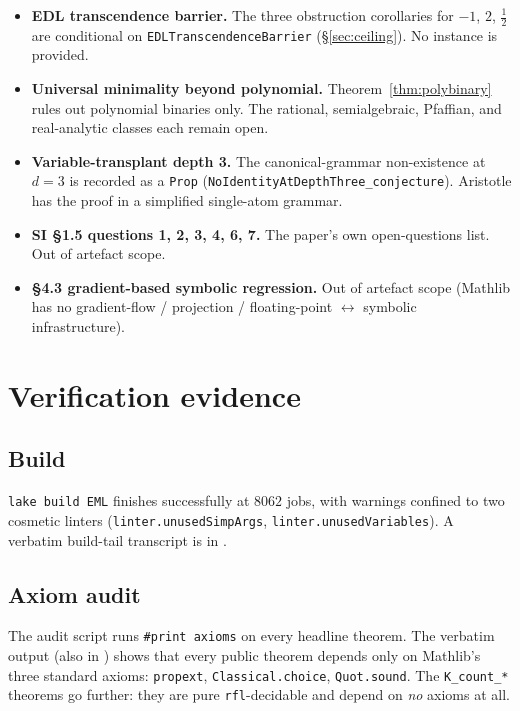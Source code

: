 \documentclass[11pt,a4paper]{article}
\theoremstyle{plain}
\theoremstyle{definition}
\begin{document}
\begin{itemize}[leftmargin=*, topsep=2pt, itemsep=2pt]
  \item \textbf{EDL transcendence barrier.} The three obstruction
    corollaries for $-1$, $2$, $\frac{1}{2}$ are conditional on
    \texttt{EDLTranscendenceBarrier} (\S\ref{sec:ceiling}). No
    instance is provided.
  \item \textbf{Universal minimality beyond polynomial.}
    Theorem~\ref{thm:polybinary} rules out polynomial binaries only.
    The rational, semialgebraic, Pfaffian, and real-analytic classes
    each remain open.
  \item \textbf{Variable-transplant depth 3.} The
    canonical-grammar non-existence at $d = 3$ is recorded as a
    \texttt{Prop} (\texttt{NoIdentityAtDepthThree\_conjecture}).
    Aristotle has the proof in a simplified single-atom grammar.
  \item \textbf{SI §1.5 questions 1, 2, 3, 4, 6, 7.} The paper's own
    open-questions list. Out of artefact scope.
  \item \textbf{§4.3 gradient-based symbolic regression.}
    Out of artefact scope (Mathlib has no gradient-flow / projection
    / floating-point $\leftrightarrow$ symbolic infrastructure).
\end{itemize}

\section{Verification evidence}\label{sec:verification}

\subsection{Build}

\texttt{lake build EML} finishes successfully at $8062$ jobs, with
warnings confined to two cosmetic linters
(\texttt{linter.unusedSimpArgs}, \texttt{linter.unusedVariables}). A
verbatim build-tail transcript is in
.

\subsection{Axiom audit}

The audit script  runs
\texttt{\#print axioms} on every headline theorem. The verbatim
output (also in ) shows that every
public theorem depends only on Mathlib's three standard axioms:
\texttt{propext}, \texttt{Classical.choice}, \texttt{Quot.sound}.
The \texttt{K\_count\_*} theorems go further: they are pure
\texttt{rfl}-decidable and depend on \emph{no} axioms at all.
\end{document}
